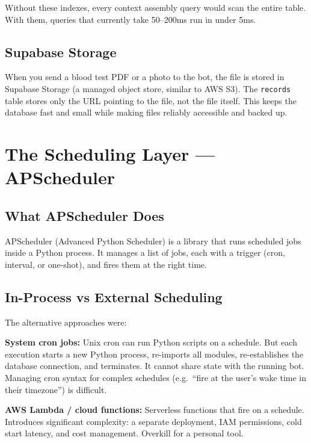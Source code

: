 \documentclass[12pt, a4paper]{article}
\begin{document}
Without these indexes, every context assembly query would scan the entire table. With them, queries that currently take 50--200ms run in under 5ms.

\subsection{Supabase Storage}

When you send a blood test PDF or a photo to the bot, the file is stored in Supabase Storage (a managed object store, similar to AWS S3). The \texttt{records} table stores only the URL pointing to the file, not the file itself. This keeps the database fast and small while making files reliably accessible and backed up.

\section{The Scheduling Layer --- APScheduler}

\subsection{What APScheduler Does}

APScheduler (Advanced Python Scheduler) is a library that runs scheduled jobs inside a Python process. It manages a list of jobs, each with a trigger (cron, interval, or one-shot), and fires them at the right time.

\subsection{In-Process vs External Scheduling}

The alternative approaches were:

\textbf{System cron jobs:} Unix cron can run Python scripts on a schedule. But each execution starts a new Python process, re-imports all modules, re-establishes the database connection, and terminates. It cannot share state with the running bot. Managing cron syntax for complex schedules (e.g.\ ``fire at the user's wake time in their timezone'') is difficult.

\textbf{AWS Lambda / cloud functions:} Serverless functions that fire on a schedule. Introduces significant complexity: a separate deployment, IAM permissions, cold start latency, and cost management. Overkill for a personal tool.
\end{document}

